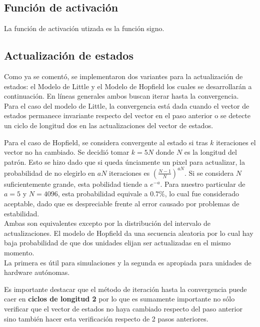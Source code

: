 \documentclass[%
    final,
    reprint,
    notitlepage,
    narroweqnarray,
    inline,
    twoside,
    invited
    ]{ieee}
\begin{document}
\subsection{Función de activación}

\par La función de activación utizada es la función signo.

\subsection{Actualización de estados}

\par Como ya se comentó, se implementaron dos variantes para la actualización de estados: el Modelo de Little y el Modelo de Hopfield los cuales se desarrollarán a continuación. En líneas generales ambos buscan iterar hasta la convergencia. \\
Para el caso del modelo de Little, la convergencia está dada cuando el vector de estados permanece invariante respecto del vector en el paso anterior o se detecte un ciclo de longitud dos en las actualizaciones del vector de estados.\\

\par Para el caso de Hopfield, se considera convergente al estado si tras $k$ iteraciones el vector no ha cambiado. Se decidió tomar 
$k = 5N$ donde $N$ es la longitud del patrón. Esto se hizo dado que si queda únciamente un pixel para actualizar, 
la probabilidad de no elegirlo en $aN$ iteraciones es $\left(\frac{N-1}{N}\right)^{aN}$. Si se considera $N$ suficientemente grande, 
esta pobilidad tiende a $e^{-a}$. Para nuestro particular de $a=5$ y $N=4096$, esta probabilidad equivale a $0.7\%$, lo 
cual fue considerado aceptable, dado que es despreciable frente al error causado por problemas de estabilidad.\\

Ambas son equivalentes excepto por la distribución del intervalo de actualizaciones. El modelo de Hopfield da una secuencia aleatoria por lo cual hay baja probabilidad de que 
dos unidades elijan ser actualizadas en el mismo momento.\\
La primera es útil para simulaciones y la segunda es apropiada para unidades de hardware autónomas.\\
\par Es importante destacar que el método de iteración hasta la convergencia puede caer en \textbf{ciclos de longitud 2} por lo que es sumamente importante no sólo verificar que el vector de estados no haya 
cambiado respecto del paso anterior sino también  hacer esta verificación respecto de 2 pasos anteriores.
\end{document}
